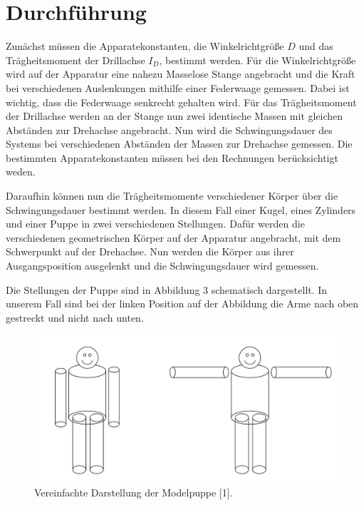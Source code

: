  \section{Durchführung}
Zunächst müssen die Apparatekonstanten, die Winkelrichtgröße $D$ und das Trägheitsmoment
der Drillachse $I_D$, bestimmt werden. Für die Winkelrichtgröße wird auf der Apparatur
eine nahezu Masselose Stange angebracht und die Kraft bei verschiedenen Auslenkungen
mithilfe einer Federwaage gemessen. Dabei ist wichtig, dass die Federwaage senkrecht gehalten wird.
Für das Trägheitsmoment der Drillachse werden an der Stange nun zwei identische Massen mit
gleichen Abständen zur Drehachse angebracht. Nun wird die Schwingungsdauer des Systems
bei verschiedenen Abständen der Massen zur Drehachse gemessen.
Die bestimmten Apparatekonstanten müssen bei den Rechnungen berücksichtigt weden.

Daraufhin können nun die Trägheitsmomente verschiedener Körper über die Schwingungsdauer
bestimmt werden. In diesem Fall einer Kugel, eines Zylinders und einer Puppe in
zwei verschiedenen Stellungen. Dafür werden die verschiedenen geometrischen Körper
auf der Apparatur angebracht, mit dem Schwerpunkt auf der Drehachse. Nun werden die Körper
aus ihrer Ausgangsposition ausgelenkt und die Schwingungsdauer wird gemessen.

Die Stellungen der Puppe sind in Abbildung 3 schematisch dargestellt. In unserem Fall
sind bei der linken Position auf der Abbildung die Arme nach oben gestreckt und nicht nach unten.

\begin{figure}
  \includegraphics[width=\textwidth]{Bild3.jpg}
  \caption{Vereinfachte Darstellung der Modelpuppe [1].}
\end{figure}
